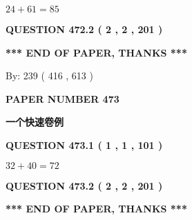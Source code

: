 \documentclass{ctexart}
\begin{document}
  
 
 

$ %
24 +  %
61=   %
85$
 
 
  
\vspace{0.2in}
  
{\textbf{\Large{QUESTION
472.2 
 ( 2 , 2 , 201 )
}}}
  
  
   
   
 \vspace{0.2in}
 
   
   
   
   
\vspace{1.0in} 
{\textbf{\large{ *** END OF PAPER, THANKS *** }}} 
   
   
\hspace{1.0in} By: 
 239 ( 416 ,  613 )
   
   
   
   
\newpage 
\setcounter{page}{ 
   473001 } 
   
   
   
   
 {\textbf{ \Large{ PAPER NUMBER  473  }}}
   
   
\vspace{0.2in}
   
   
   
   
   
   
 \vspace{0.2in}
{\LARGE {\textbf{ 一个快速卷例}}}
   
   
  
\vspace{0.2in}
  
{\textbf{\Large{QUESTION
473.1 
 ( 1 , 1 , 101 )
}}}
  
  
 
 

$ %
32 +  %
40=   %
72$
 
 
  
\vspace{0.2in}
  
{\textbf{\Large{QUESTION
473.2 
 ( 2 , 2 , 201 )
}}}
  
  
   
   
 \vspace{0.2in}
 
   
   
   
   
\vspace{1.0in} 
{\textbf{\large{ *** END OF PAPER, THANKS *** }}} 
   
\end{document}
